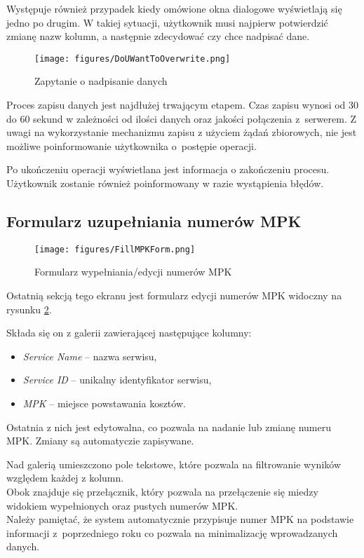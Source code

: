 Występuje również przypadek kiedy omówione okna dialogowe wyświetlają się jedno po drugim. W takiej sytuacji, użytkownik musi najpierw potwierdzić zmianę nazw kolumn, a następnie zdecydować czy chce nadpisać dane.

\begin{figure}[h]
    \centering
    \texttt{[image: figures/DoUWantToOverwrite.png]}
    \caption{Zapytanie o nadpisanie danych}
    \label{fig:DoYouWantToOverwrite}
\end{figure}

Proces zapisu danych jest najdłużej trwającym etapem. Czas zapisu wynosi od 30 do 60 sekund w zależności od ilości danych oraz jakości połączenia z~serwerem. Z uwagi na wykorzystanie mechanizmu zapisu z użyciem żądań zbiorowych, nie jest możliwe poinformowanie użytkownika o~postępie operacji.

Po ukończeniu operacji wyświetlana jest informacja o zakończeniu procesu. Użytkownik zostanie również poinformowany w razie wystąpienia błędów.

\subsection{Formularz uzupełniania numerów MPK}
\begin{figure}[h]
    \centering
    \texttt{[image: figures/FillMPKForm.png]}
    \caption{Formularz wypełniania/edycji numerów MPK}
    \label{fig:fillmpkform}
\end{figure}

Ostatnią sekcją tego ekranu jest formularz edycji numerów MPK widoczny na rysunku \ref{fig:fillmpkform}.

Składa się on z galerii zawierającej następujące kolumny:
\begin{itemize}
    \item \emph{Service Name} -- nazwa serwisu,
    \item \emph{Service ID} -- unikalny identyfikator serwisu,
    \item \emph{MPK} -- miejsce powstawania kosztów.
\end{itemize}
Ostatnia z nich jest edytowalna, co pozwala na nadanie lub zmianę numeru MPK. Zmiany są automatyczie zapisywane.

Nad galerią umieszczono pole tekstowe, które pozwala na filtrowanie wyników względem każdej z kolumn. \\Obok znajduje się przełącznik, który pozwala na przełączenie się miedzy widokiem wypełnionych oraz pustych numerów MPK.\\
Należy pamiętać, że system automatycznie przypisuje numer MPK na podstawie informacji z~poprzedniego roku co pozwala na minimalizację wprowadzanych danych.

